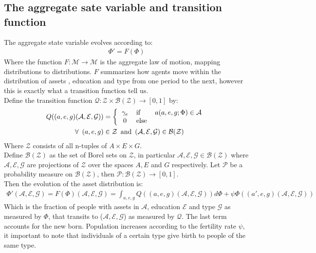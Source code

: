  \subsection*{The aggregate sate variable and transition function}
\noindent The aggregate state variable evolves according to:
\begin{align}
\Phi'=F(\Phi)
\end{align} 
Where the function $F:\mathcal{M}\to\mathcal{M}$ is the aggregate law of motion, mapping distributions to distributions. $F$ summarizes how agents move within the distribution of assets , education and type from one period to the next, however this is exactly what a transition function tell us. \\
\noindent Define the transition function $\mathcal{Q}:\mathcal{Z}\times\mathcal{B(Z)}\to[0,1]$ by: 
\begin{align*}
Q((a,e,g)(\mathcal{A},\mathcal{E},\mathcal{G})) &= \left\{
\begin{tabular}{clc}
$\gamma_{e}$ & if      & $a(a,e,g;\Phi) \in \mathcal{A} $\\
0 & else & 
\end{tabular}
\right.\\
\forall \,\,\,(a,e,g)&\in\mathcal{Z}\,\,\,\mbox{and}\,\,\,(\mathcal{A,E,G})\in{\mathcal{B(Z)}}
\end{align*}
Where $\mathcal{Z}$ consists of all n-tuples of $A\times E\times G$. \\
Define $\mathcal{B(Z)}$ as the set of Borel sets on $\mathcal{Z}$, in particular $\mathcal{A,E,G}\in\mathcal{B(Z)}$ where $\mathcal{A,E,G}$ are projections of $\mathcal{Z}$ over the spaces $A,E$ and $G$ respectively. Let $\mathcal{P}$ be a probability measure on $\mathcal{B(Z)}$, then $\mathcal{P}: \mathcal{B(Z)}\to[0,1]$.\\
Then the evolution of the asset distribution is:
\begin{align}
\Phi'(\mathcal{A},\mathcal{E},\mathcal{G}) = F(\Phi) (\mathcal{A},\mathcal{E},\mathcal{G})= \int_{a,e,g} Q((a,e,g)(\mathcal{A},\mathcal{E},\mathcal{G})) d \Phi+\psi\Phi((a',e,g)(\mathcal{A},\mathcal{E},\mathcal{G}))
\end{align}
Which is the fraction of people with assets in $\mathcal{A}$, education $\mathcal{E}$ and type $\mathcal{G}$ as measured by $\Phi$, that transits to ($\mathcal{A,E,G}$) as measured by $\mathcal{Q}$. The last term accounts for the new born. Population increases according to the fertility rate $\psi$, it important to note that individuals of a certain type give birth to people of the same type.
 
